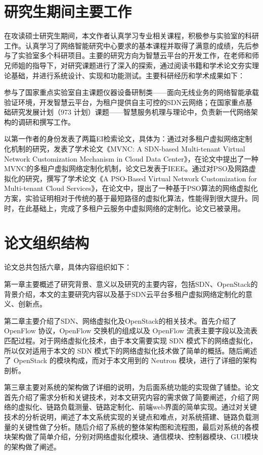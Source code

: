 \section{研究生期间主要工作}
在攻读硕士研究生期间，本文作者认真学习专业相关课程，积极参与实验室的科研工作。认真学习了网络智能研究中心要求的基本课程并取得了满意的成绩，先后参与了实验室多个科研项目。主要的研究方向为智慧云平台的开发工作，在老师和师兄师姐的指导下，对研究课题进行了深入的探索，通过阅读书籍和学术论文夯实理论基础，并进行系统设计、实现和功能测试。主要科研经历和学术成果如下：

参与了国家重点实验室自主课题仪器设备研制类——面向无线业务的网络智能承载验证环境，开发智慧云平台，为租户提供自主可控的SDN云网络；在国家重点基础研究发展计划（973 计划）课题——智慧服务机理与理论中，负责新一代网络架构的调研和撰写工作。

以第一作者的身份发表了两篇EI检索论文，具体为：通过对多租户虚拟网络定制化机制的研究，发表了学术论文《MVNC: A SDN-based Multi-tenant Virtual Network Customization Mechanism in Cloud Data Center》，在论文中提出了一种MVNC的多租户虚拟网络定制化机制，论文已发表于IEEE。通过对\gls*{PSO}及网路虚拟化的研究，撰写了学术论文《A PSO-Based Virtual Network Customization for Multi-tenant Cloud Services》，在论文中，提出了一种基于PSO算法的网络虚拟化方案，实验证明相对于传统的基于最短路径的虚拟化算法，性能得到很大提升。同时，在此基础上，完成了多租户云服务中虚拟网络的定制化。论文已被录用。
\section{论文组织结构}
论文总共包括六章，具体内容组织如下：

第一章主要概述了研究背景、意义以及研究的主要内容，包括SDN、OpenStack的背景介绍，本文的主要研究内容以及基于SDN云平台多租户虚拟网络定制化的意义、创新点。

第二章主要介绍了SDN、网络虚拟化及OpenStack的相关技术。首先介绍了OpenFlow 协议，OpenFlow 交换机的组成以及 OpenFlow 流表主要字段以及流表匹配过程。对于网络虚拟化技术，由于本文需要实现 SDN 模式下的网络虚拟化，所以仅对适用于本文的 SDN 模式下的网络虚拟化技术做了简单的概括。随后阐述了 OpenStack 的模块构成，而对于本文用到的 Neutron 模块，进行了详细的架构剖析。

第三章主要对系统的架构做了详细的说明，为后面系统功能的实现做了铺垫。论文首先介绍了需求分析和关键技术，对本文研究内容的需求做了简要阐述，介绍了网络的虚拟化、链路负载测量、链路定制化、前端web界面的简单实现。通过对关键技术的分析说明，阐述了本文系统实现的关键点和难点，对系统搭建、链路负载测量的关键性做了分析。随后介绍了系统的整体架构图和流程图，最后对系统的各模块架构做了简单介绍，分别对网络虚拟化模块、通信模块、控制器模块、GUI模块的架构做了阐述。

